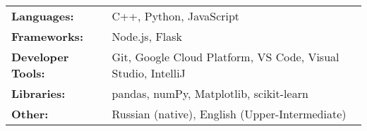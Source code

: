 \begin{tabularx}{\linewidth}{@{}l X@{}}
  \textbf{Languages:} & \normalsize{C++, Python, JavaScript} \\
  \textbf{Frameworks:} &  \normalsize{Node.js, Flask}\\
  \textbf{Developer Tools:}  &  \normalsize{Git, Google Cloud Platform, VS Code, Visual Studio, IntelliJ}\\  
  \textbf{Libraries:}  &  \normalsize{pandas, numPy, Matplotlib, scikit-learn}\\  
  \textbf{Other:} & \normalsize{ Russian (native), English (Upper-Intermediate)} \\
\end{tabularx}
